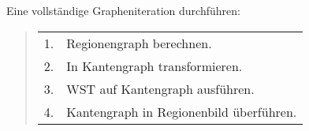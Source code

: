 Eine vollst\"andige Grapheniteration durchf\"uhren:
\begin{quote}
\begin{tabular}{ll}
1.&     Regionengraph berechnen.\\
2.&     In Kantengraph transformieren.\\
3.&     WST auf Kantengraph ausf\"uhren.\\
4.&     Kantengraph in Regionenbild \"uberf\"uhren.\\
\end{tabular}
\end{quote}










